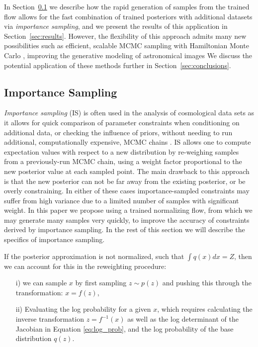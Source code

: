 \documentclass[fleqn,usenatbib]{mnras}
\begin{document}
In Section~\ref{sec:importance_sampling} we describe how the rapid generation of samples from the trained flow allows for the fast combination of trained posteriors with additional datasets via \emph{importance sampling}, and we present the results of this application in Section~\ref{sec:results}. However, the flexibility of this approach admits many new possibilities such as efficient, scalable MCMC sampling with Hamiltonian Monte Carlo \citep{hoffman/etal:2019}, improving the generative modeling of astronomical images \citep{thorne/etal:2021, kingma/etal:2016}   We discuss the potential application of these methods further in Section~\ref{sec:conclusions}.

\subsection{Importance Sampling}
\label{sec:importance_sampling}

\emph{Importance sampling} (IS) is often used in the analysis of cosmological data sets as it allows for quick comparison of parameter constraints when conditioning on additional data, or checking the influence of priors, without needing to run additional, computationally expensive, MCMC chains \citep{lewis/bridle:2002}. IS allows one to compute expectation values with respect to a new distribution by re-weighing samples from a previously-run MCMC chain, using a weight factor proportional to the new posterior value at each sampled point. The main drawback to this approach is that the new posterior can not be far away from the existing posterior, or be overly constraining. In either of these cases importance-sampled constraints may suffer from high variance due to a limited number of samples with significant weight. In this paper we propose using a trained normalizing flow, from which we may generate many samples very quickly, to improve the accuracy of constraints derived by importance sampling. In the rest of this section we will describe the specifics of importance sampling. 

If the posterior approximation is not normalized, such that $\int q(x)dx = Z$, then we can account for this in the reweighting procedure:

\begin{itemize}
\item[i)] we can sample $x$ by first sampling $z \sim p(z)$ and pushing this through the transformation: $x = f(z)$, 
\item[ii)] Evaluating the log probability for a given $x$, which requires calculating the inverse transformation $z = f^{-1}(x)$ as well as the log determinant of the Jacobian in Equation \ref{eq:log_prob}, and the log probability of the base distribution $q(z)$.  
\end{itemize}
\end{document}
